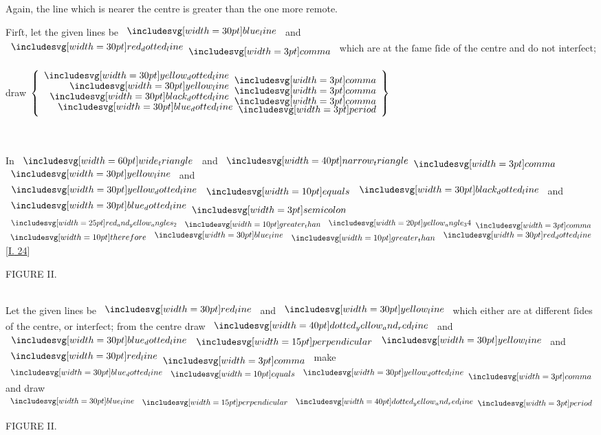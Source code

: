 \documentclass[11pt,preview]{standalone}
\begin{document}
\hfill

\begin{center}
    Again, the line which is nearer the centre is greater than the one more remote.
\end{center}

\begin{center}
    Firſt, let the given lines be $\blueline$ and $\dottedredline \bcomma$ which are at the ſame ſide of the centre and do not interſect;\\
    \hfill\\
    draw $\left\{\begin{aligned}\dottedyellowline \bcomma \\[-2ex] \yellowline \bcomma \\[-2ex] \dottedblackline \bcomma \\[-2ex] \dottedblueline \bperiod \end{aligned}\right\}$\\
    \hfill\\
    \hfill\\
\end{center}

\begin{center}
    In $\img[0][0][60]{wide_triangle}$ and $\img[0][0][40]{narrow_triangle} \bcomma$\\
    $\yellowline$ and $\dottedyellowline \bequals \dottedblackline$ and $\dottedblueline \bsemicolon$\\
    $\img{red_and_yellow_angles_2} \bgt \img[0][0][20]{yellow_angle_34} \bcomma$\\
    $\btherefore \blueline \bgt \dottedredline$ [\hyperref[book1pr24]{\textsc{I.} 24}]
\end{center}

\hfill

\begin{minipage}[t]{0.54\textwidth}
    \vspace{0pt}
    \begin{center}
        FIGURE II.\\
        \hfill\\
        \raggedright Let the given lines be $\redline$ and $\yellowline$ which either are at different ſides of the centre, or interſect; from the centre draw $\img[0.5][0][40]{dotted_yellow_and_red_line}$ and $\dottedblueline \bperp \yellowline$ and $\redline \bcomma$ make $\dottedblueline \bequals \dottedyellowline \bcomma$ and draw $\blueline \bperp \img[0.5][0][40]{dotted_yellow_and_red_line} \bperiod$
    \end{center}
\end{minipage}%
\hfill
\begin{minipage}[t]{0.43\textwidth}
    \vspace{0pt}
    \begin{center}
        FIGURE II.
    \end{center}
    \hfill\\
    
\end{minipage}%
\end{document}
